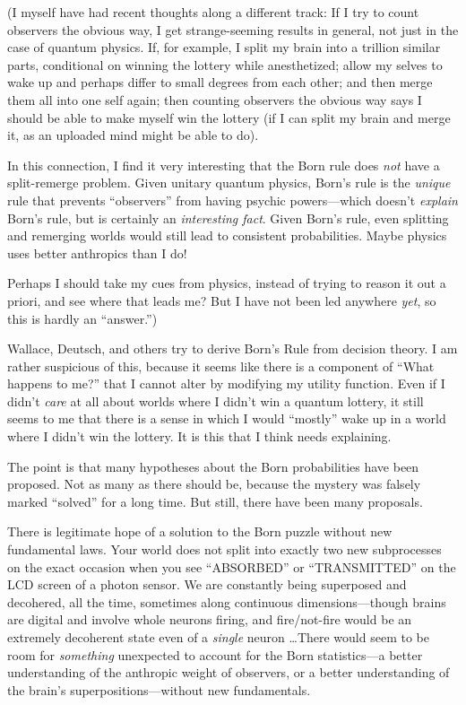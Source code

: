 {
 (I myself have had recent thoughts along a different track: If I
try to count observers the obvious way, I get strange-seeming results
in general, not just in the case of quantum physics. If, for example, I
split my brain into a trillion similar parts, conditional on winning
the lottery while anesthetized; allow my selves to wake up and perhaps
differ to small degrees from each other; and then merge them all into
one self again; then counting observers the obvious way says I should
be able to make myself win the lottery (if I can split my brain and
merge it, as an uploaded mind might be able to do).}

{
 In this connection, I find it very interesting that the Born rule
does \textit{not} have a split-remerge problem. Given unitary quantum
physics, Born's rule is the \textit{unique} rule that
prevents ``observers'' from having
psychic powers---which doesn't \textit{explain}
Born's rule, but is certainly an \textit{interesting
fact}. Given Born's rule, even splitting and remerging
worlds would still lead to consistent probabilities. Maybe physics uses
better anthropics than I do!}

{
 Perhaps I should take my cues from physics, instead of trying to
reason it out a priori, and see where that leads me? But I have not
been led anywhere \textit{yet}, so this is hardly an
``answer.'')}

{
 Wallace, Deutsch, and others try to derive Born's
Rule from decision theory. I am rather suspicious of this, because it
seems like there is a component of ``What happens to
me?'' that I cannot alter by modifying my utility
function. Even if I didn't \textit{care} at all about
worlds where I didn't win a quantum lottery, it still
seems to me that there is a sense in which I would
``mostly'' wake up in a world where
I didn't win the lottery. It is this that I think needs
explaining.}

{
 The point is that many hypotheses about the Born probabilities
have been proposed. Not as many as there should be, because the mystery
was falsely marked ``solved'' for a
long time. But still, there have been many proposals.}

{
 There is legitimate hope of a solution to the Born puzzle without
new fundamental laws. Your world does not split into exactly two new
subprocesses on the exact occasion when you see
``ABSORBED'' or
``TRANSMITTED'' on the LCD screen of
a photon sensor. We are constantly being superposed and decohered, all
the time, sometimes along continuous dimensions---though brains are
digital and involve whole neurons firing, and fire/not-fire would be an
extremely decoherent state even of a \textit{single} neuron \ldots There
would seem to be room for \textit{something} unexpected to account for
the Born statistics---a better understanding of the anthropic weight of
observers, or a better understanding of the brain's
superpositions---without new fundamentals.}


